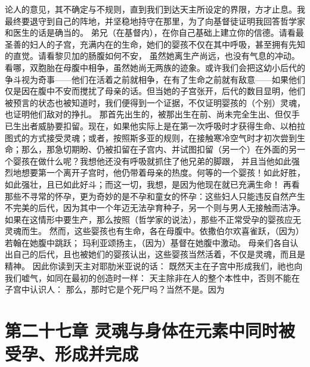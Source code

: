 论人的意见，其不确定与不规则，直到我们到达天主所设定的界限，方才止息。我最终要退守到自己的阵地，并坚稳地持守在那里，为了向基督徒证明我回答哲学家和医生的话是确当的。\newline{} 弟兄（在基督内），在你自己基础上建立你的信德。请看最圣善的妇人的子宫，充满内在的生命，她们的婴孩不仅在其中呼吸，甚至拥有先知的直觉。请看黎贝加的肠腹如何不安， 虽然她离生产尚远，也没有气息的冲动。看哪，双胞胎在母腹中相争，虽然她尚无两族的迹象。或许我们会把这幼小后代的争斗视为奇事——他们在活着之前就相争，在有了生命之前就有敌意——如果他们仅是因在腹中不安而搅扰了母亲的话。但当她的子宫张开，后代的数目显明，他们被预言的状态也被知道时，我们便得到一个证据，不仅证明婴孩的（个别）灵魂，也证明他们敌对的挣扎。\newline{} 那首先出生的，被那出生在前、尚未完全生出、但仅手已生出者威胁要扣留。现在，如果他实际上是在第一次呼吸时才获得生命、以柏拉图式的方式接受灵魂；或者，按照斯多亚的规则，在接触寒冷空气时才初次尝到生命；那么，那急切期盼、仍被扣留在子宫内、并试图扣留（另一个）在外面的另一个婴孩在做什么呢？我想他还没有呼吸就抓住了他兄弟的脚跟， 并且当他如此强烈地想要第一个离开子宫时，他仍带着母亲的热度。何等的一个婴孩！如此好胜，如此强壮，且已如此好斗；而这一切，我想，是因为他现在就已充满生命！\newline{} 再看那些不寻常的怀孕，更为奇妙的是不孕和童女的怀孕：这些妇人只能违反自然产生不完美的后代，因为其中一个年迈无法孕育种子，另一个则与男人无接触而洁净。如果在这情形中要生产，那么按照（哲学家的说法），那些不正常受孕的婴孩应无灵魂而生。\newline{} 然而，这些婴孩也有生命，各在母腹中。依撒伯尔欢喜雀跃，（因为）若翰在她腹中跳跃； 玛利亚颂扬主，（因为）基督在她腹中激动。 母亲们各自认出自己的后代，且也被她们的婴孩认出，这些婴孩当然活着，不仅是灵魂，而且是精神。\newline{} 因此你读到天主对耶肋米亚说的话： 既然天主在子宫中形成我们，祂也向我们嘘气，如同在最初的创造时一样： 天主除非在人的整个本性中，否则不能在子宫中认识人： 那么，那时它是个死尸吗？当然不是。因为\par


\section{第二十七章 灵魂与身体在元素中同时被受孕、形成并完成}

